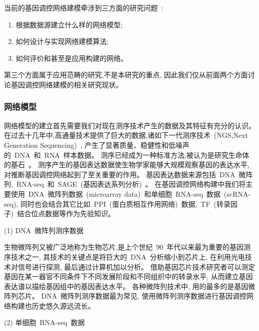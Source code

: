 当前的基因调控网络建模牵涉到三方面的研究问题~\cite{schlitt2007current}:
\begin{enumerate}
    \item 根据数据源建立什么样的网络模型;
    \item 如何设计与实现网络建模算法;
    \item 如何评价和甚至是应用构建的网络。
\end{enumerate}

第三个方面属于应用范畴的研究,不是本研究的重点, 因此我们仅从前面两个方面讨论基因调控网络建模的相关研究现状。


\subsubsection{网络模型}

网络模型的建立首先需要我们对现在测序技术产生的数据及其特征有充分的认识。
在过去十几年中,高通量技术提供了巨大的数据,诸如下一代测序技术~(NGS,Next Generation Sequencing)~\cite{BUERMANS20141932}, 
产生了显著质量、稳健性和低噪声的~DNA~和~RNA~样本数据。
测序已经成为一种标准方法,被认为是研究生命体的基石~\cite{CEREB2015923}。
测序产生的基因表达数据使生物学家能够大规模观察基因的表达水平, 对推断基因调控网络起到了至关重要的作用。
基因表达数据来源包括~DNA~微阵列,~RNA-seq~\cite{morin2008profiling}和~SAGE~(基因表达系列分析)~\cite{velculescu1995serial}。
在基因调控网络构建中我们将主要使用~DNA~微阵列数据~(microarray data)~和单细胞~RNA-seq~数据~(scRNA-seq),
同时也会结合其它比如~PPI~(蛋白质相互作用网络)~数据,~TF~(转录因子)~结合位点数据等作为先验知识。

(1) DNA~微阵列测序数据

生物微阵列又被广泛地称为生物芯片,是上个世纪~90~年代以来最为重要的基因测序技术之一,
其技术的关键点是将巨大的~DNA~分析缩小到芯片上, 在利用光电技术对信号进行探测, 最后通过计算机加以分析。
借助基因芯片技术研究者可以测定基因在某一器官不同条件下不同发展阶段和不同组织中的转录水平,
从而建立基因表达谱以描绘基因组中的基因表达水平。
各种微阵列技术中, 用的最多的是基因微阵列芯片。
DNA~微阵列测序数据最为常见, 使用微阵列测序数据进行基因调控网络构建也历史悠久源远流长。

(2) 单细胞~RNA-seq~数据

